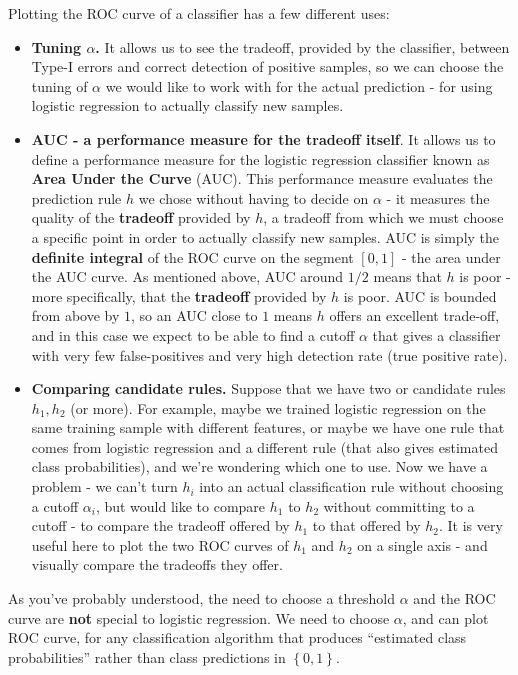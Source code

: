 	Plotting the ROC curve of a classifier has a few different uses:
	\begin{itemize}
	  \item {\bf Tuning $\alpha$.} It allows us to see the tradeoff, provided by the classifier,
	    between Type-I errors and correct detection of positive samples, so
	    we can choose the tuning of $\alpha$ we would like to work with for
	    the actual prediction - for using logistic regression  to actually
	    classify new samples.
	  \item {\bf AUC - a performance measure for the tradeoff itself}. 
	    It allows us to define a performance measure for the logistic
	    regression classifier known as {\bf Area Under the Curve} (AUC).
	    This performance measure evaluates the prediction rule $h$ we chose
	    without having to decide on $\alpha$ - it measures the quality of
	    the {\bf tradeoff} provided by $h$, a tradeoff from which we must
	    choose a specific point in order to actually classify new samples.
	    AUC is simply the {\bf definite integral} of the ROC curve on 
	    the segment $[0,1]$ - the area under the AUC curve. As mentioned
	    above, AUC around $1/2$ means that $h$ is poor - more specifically,
	    that the {\bf tradeoff} provided by $h$ is poor. AUC is bounded from above by $1$,
	    so an AUC close to $1$ means $h$ offers an excellent trade-off, and
	    in this case
	    we expect to be able to find a cutoff $\alpha$ that gives a
	    classifier with very few false-positives and very high detection
	    rate (true positive rate).
	  \item {\bf Comparing candidate rules.} Suppose that we have two or
	    candidate rules $h_1,h_2$ (or more). For example, maybe we trained
	    logistic regression on the same training sample with different
	    features, or maybe we have one rule that comes from logistic
	    regression and a different rule (that also gives estimated class
	    probabilities), and we're wondering which one to use. Now we have a
	    problem - we can't turn $h_i$ into an actual classification rule
	    without choosing a cutoff $\alpha_i$, but would like to compare
	    $h_1$ to $h_2$ without committing to a cutoff - to compare the
	    tradeoff offered by $h_1$ to that offered by $h_2$. It is very
	    useful here to plot the two ROC curves of $h_1$ and $h_2$ on a
	    single axis - and visually compare the tradeoffs they offer. 
	\end{itemize}



	As you've probably understood, the need to choose a threshold $\alpha$
	and the ROC curve are {\bf not} special to
	logistic regression. We need to choose $\alpha$, and can plot ROC curve,
	for any classification algorithm that produces ``estimated class
	probabilities'' rather than class predictions in $\left\{ 0,1
	\right\}$.


